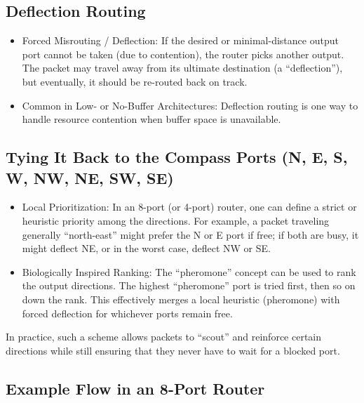 \documentclass[../../../OAE-SPEC-MAIN.tex]{subfiles}
\begin{document}
\subsection{Deflection Routing}

\begin{itemize}
\item Forced Misrouting / Deflection: If the desired or minimal-distance output port cannot be taken (due to contention), the router picks another output. The packet may travel away from its ultimate destination (a “deflection”), but eventually, it should be re-routed back on track.
\item Common in Low- or No-Buffer Architectures: Deflection routing is one way to handle resource contention when buffer space is unavailable.
\end{itemize}
%
\subsection{Tying It Back to the Compass Ports (N, E, S, W, NW, NE, SW, SE)}
%
\begin{itemize}
\item Local Prioritization: In an 8-port (or 4-port) router, one can define a strict or heuristic priority among the directions. For example, a packet traveling generally “north-east” might prefer the N or E port if free; if both are busy, it might deflect NE, or in the worst case, deflect NW or SE.
\item Biologically Inspired Ranking: The “pheromone” concept can be used to rank the output directions. The highest “pheromone” port is tried first, then so on down the rank. This effectively merges a local heuristic (pheromone) with forced deflection for whichever ports remain free.
\end{itemize}

In practice, such a scheme allows packets to “scout” and reinforce certain directions while still ensuring that they never have to wait for a blocked port.

\subsection{Example Flow in an 8-Port Router}
\end{document}
